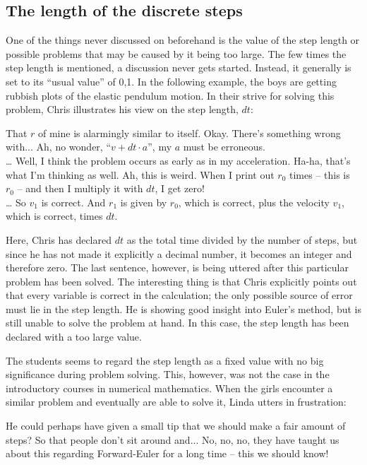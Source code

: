 \documentclass[aps,prb,floatfix,twocolumn,twoside,english]{revtex4-1}
\begin{document}
\subsection{The length of the discrete steps}

One of the things never discussed on beforehand is the value of the step length or possible problems that may be caused by it being too large. The few times the step length is mentioned, a discussion never gets started. Instead, it generally is set to its ``usual value'' of 0,1. In the following example, the boys are getting rubbish plots of the elastic pendulum motion. In their strive for solving this problem, Chris illustrates his view on the step length, $dt$:

\begin{dialogue}
\small
{} That $r$ of mine is alarmingly similar to itself. Okay. There's something wrong with... Ah, no wonder, ``$v + dt \cdot a$'', my $a$ must be erroneous.
\\ \dots
{} Well, I think the problem occurs as early as in my acceleration.
 Ha-ha, that's what I'm thinking as well. Ah, this is weird. When I print out $r_0$ times -- this is $r_0$ -- and then I multiply it with $dt$, I get zero! 
\\ \dots
{} So $v_1$ is correct. And $r_1$ is given by $r_0$, which is correct, plus the velocity $v_1$, which is correct, times $dt$.
\end{dialogue}

Here, Chris has declared $dt$ as the total time divided by the number of steps, but since he has not made it explicitly a decimal number, it becomes an integer and therefore zero. The last sentence, however, is being uttered after this particular problem has been solved. The interesting thing is that Chris explicitly points out that every variable is correct in the calculation; the only possible source of error must lie in the step length. He is showing good insight into Euler's method, but is still unable to solve the problem at hand. In this case, the step length has been declared with a too large value.

The students seems to regard the step length as a fixed value with no big significance during problem solving. This, however, was not the case in the introductory courses in numerical mathematics. When the girls encounter a similar problem and eventually are able to solve it, Linda utters in frustration:

\begin{dialogue}
\small
{} He could perhaps have given a small tip that we should make a fair amount of steps? So that people don't sit around and...
 No, no, no, they have taught us about this regarding Forward-Euler for a long time -- this we should know!
\end{dialogue}
\end{document}
